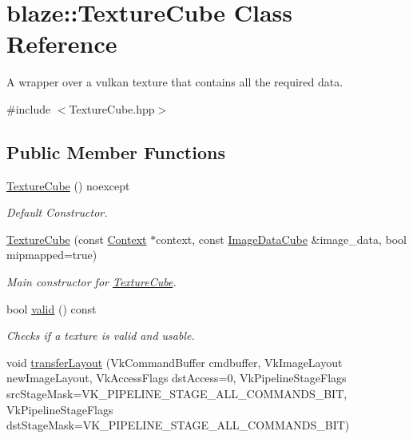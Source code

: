 \hypertarget{classblaze_1_1TextureCube}{}\section{blaze\+:\+:Texture\+Cube Class Reference}
\label{classblaze_1_1TextureCube}


A wrapper over a vulkan texture that contains all the required data.  




{\ttfamily \#include $<$Texture\+Cube.\+hpp$>$}

\subsection*{Public Member Functions}
\begin{DoxyCompactItemize}
\item 
\mbox{\label{classblaze_1_1TextureCube_aafca1ecaae4a7d9d8515603c5d25c7af}} 
\hyperlink{classblaze_1_1TextureCube_aafca1ecaae4a7d9d8515603c5d25c7af}{Texture\+Cube} () noexcept
\begin{DoxyCompactList}\small\item\em Default Constructor. \end{DoxyCompactList}\item 
\hyperlink{classblaze_1_1TextureCube_ac7d8162cc7411ac1c9f680e9419c19e4}{Texture\+Cube} (const \hyperlink{classblaze_1_1Context}{Context} $\ast$context, const \hyperlink{structblaze_1_1ImageDataCube}{Image\+Data\+Cube} \&image\+\_\+data, bool mipmapped=true)
\begin{DoxyCompactList}\small\item\em Main constructor for \hyperlink{classblaze_1_1TextureCube}{Texture\+Cube}. \end{DoxyCompactList}\item 
bool \hyperlink{classblaze_1_1TextureCube_aa1a49eebe8b2a63878b52321149d4c5b}{valid} () const
\begin{DoxyCompactList}\small\item\em Checks if a texture is valid and usable. \end{DoxyCompactList}\item 
void \hyperlink{classblaze_1_1TextureCube_aafdee6f11a7272e2ff8ccd8514177500}{transfer\+Layout} (Vk\+Command\+Buffer cmdbuffer, Vk\+Image\+Layout new\+Image\+Layout, Vk\+Access\+Flags dst\+Access=0, Vk\+Pipeline\+Stage\+Flags src\+Stage\+Mask=V\+K\+\_\+\+P\+I\+P\+E\+L\+I\+N\+E\+\_\+\+S\+T\+A\+G\+E\+\_\+\+A\+L\+L\+\_\+\+C\+O\+M\+M\+A\+N\+D\+S\+\_\+\+B\+IT, Vk\+Pipeline\+Stage\+Flags dst\+Stage\+Mask=V\+K\+\_\+\+P\+I\+P\+E\+L\+I\+N\+E\+\_\+\+S\+T\+A\+G\+E\+\_\+\+A\+L\+L\+\_\+\+C\+O\+M\+M\+A\+N\+D\+S\+\_\+\+B\+IT)

\end{DoxyCompactItemize}
